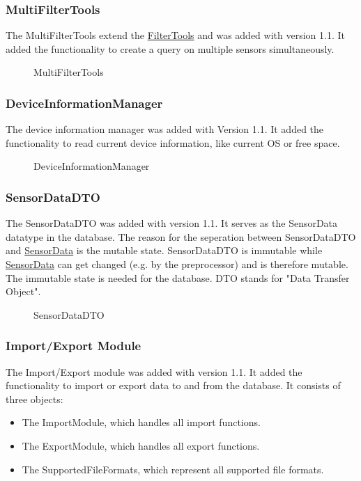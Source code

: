 \documentclass[12pt]{article}
\newcounter{fr}
\begin{document}
\subsubsection{MultiFilterTools}
\label{sec:MultiFilterTools}
The MultiFilterTools extend the \hyperref[sec:FilterTools]{FilterTools} and was added with version 1.1. It added the functionality to create a query on multiple sensors simultaneously. 
\begin{figure}[ht]
\centering

\caption{\label{fig:bild13} MultiFilterTools}
\end{figure}
\newpage

\subsubsection{DeviceInformationManager}
\label{sec:DeviceInformationManager}
The device information manager was added with Version 1.1. It added the functionality to read current device information, like current OS or free space.
\begin{figure}[ht]
\centering

\caption{\label{fig:bild14} DeviceInformationManager}
\end{figure}


\subsubsection{SensorDataDTO}
\label{sec:SensorDataDTO}
The SensorDataDTO was added with version 1.1. It serves as the SensorData datatype in the database. The reason for the seperation between SensorDataDTO and \hyperref[sec:SensorData]{SensorData} is the mutable state. SensorDataDTO is immutable while \hyperref[sec:SensorData]{SensorData} can get changed (e.g. by the preprocessor) and is therefore mutable. The immutable state is needed for the database. DTO stands for "Data Transfer Object".

\begin{figure}[ht]
\centering

\caption{\label{fig:bild15} SensorDataDTO}
\end{figure}
\newpage


\subsubsection{Import/Export Module}
\label{sec:Import/ExportModule}
The Import/Export module was added with version 1.1. It added the functionality to import or export data to and from the database. It consists of three objects:
\begin{itemize}
  \item The ImportModule, which handles all import functions.
  \item The ExportModule, which handles all export functions.
  \item The SupportedFileFormats, which represent all supported file formats.
\end{itemize}
\end{document}
